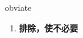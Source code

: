 
\begin{frame}
{\huge obviate}
\begin{center}
\begin{enumerate}\Large
  \item \textbf{排除，使不必要}
\end{enumerate}
\end{center}
\end{frame}
